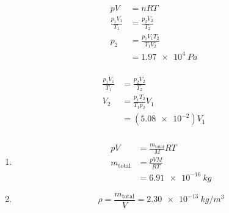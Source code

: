 \documentclass{article}
\begin{document}
\setcounter{subsubsection}{8}
\subsubsection{}

\begin{align*}
  p V                 & = n R T                       \\
  \frac{p_1 V_1}{T_1} & = \frac{p_2 V_2}{T_2}         \\
  p_2                 & = \frac{p_1 V_1 T_2}{T_1 V_2} \\
                      & = \qty{1.97e4}{Pa}
\end{align*}

\setcounter{subsubsection}{12}
\subsubsection{}

\begin{align*}
  \frac{p_1 V_1}{T_1} & = \frac{p_2 V_2}{T_2}         \\
  V_2                 & = \frac{p_1 T_2}{T_1 p_2} V_1 \\
                      & = (\num{5.08e-2}) V_1
\end{align*}

\setcounter{subsubsection}{16}
\subsubsection{}

\begin{enumerate}
  \item

        \begin{align*}
          p V            & = \frac{m_\text{total}}{M} R T \\
          m_\text{total} & = \frac{p V M}{R T}            \\
                         & = \qty{6.91e-16}{kg}
        \end{align*}

  \item \[\rho = \frac{m_\text{total}}{V} = \qty{2.30e-13}{kg/m^3}\]
\end{enumerate}

\setcounter{subsubsection}{20}
\subsubsection{}
\end{document}
